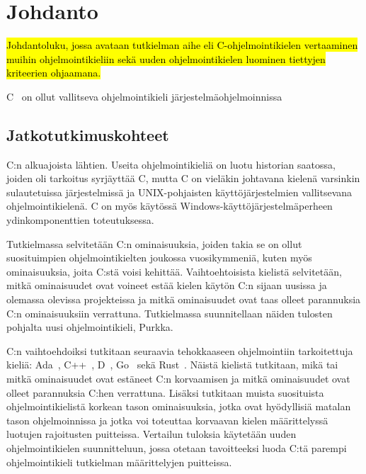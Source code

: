 \section{Johdanto}

\hl{Johdantoluku, jossa avataan tutkielman aihe eli C-ohjelmointikielen
vertaaminen muihin ohjelmointikieliin sekä uuden ohjelmointikielen luominen
tiettyjen kriteerien ohjaamana.}

C~\citep{C18} on ollut vallitseva ohjelmointikieli järjestelmäohjelmoinnissa
\subsection{Jatkotutkimuskohteet}

C:n alkuajoista lähtien. Useita ohjelmointikieliä on luotu historian saatossa,
joiden oli tarkoitus syrjäyttää C, mutta C on vieläkin johtavana kielenä
varsinkin sulautetuissa järjestelmissä ja UNIX-pohjaisten käyttöjärjestelmien
vallitsevana ohjelmointikielenä. C on myös käytössä
Windows-käyttöjärjestelmäperheen ydinkomponenttien toteutuksessa.

Tutkielmassa selvitetään C:n ominaisuuksia, joiden takia se on ollut
suosituimpien ohjelmointikielten joukossa vuosikymmeniä, kuten myös
ominaisuuksia, joita C:stä voisi kehittää. Vaihtoehtoisista kielistä
selvitetään, mitkä ominaisuudet ovat voineet estää kielen käytön C:n sijaan
uusissa ja olemassa olevissa projekteissa ja mitkä ominaisuudet ovat taas
olleet parannuksia C:n ominaisuuksiin verrattuna. Tutkielmassa suunnitellaan
näiden tulosten pohjalta uusi ohjelmointikieli, Purkka.

C:n vaihtoehdoiksi tutkitaan seuraavia tehokkaaseen ohjelmointiin tarkoitettuja
kieliä: Ada~\citep{ADA12}, C++~\citep{CPP17}, D~\citep{D}, Go~\citep{golang}
sekä Rust~\citep{rust}. Näistä kielistä tutkitaan, mikä tai mitkä ominaisuudet
ovat estäneet C:n korvaamisen ja mitkä ominaisuudet ovat olleet parannuksia
C:hen verrattuna. Lisäksi tutkitaan muista suosituista ohjelmointikielistä
korkean tason ominaisuuksia, jotka ovat hyödyllisiä matalan tason
ohjelmoinnissa ja jotka voi toteuttaa korvaavan kielen määrittelyssä luotujen
rajoitusten puitteissa. Vertailun tuloksia käytetään uuden ohjelmointikielen
suunnitteluun, jossa otetaan tavoitteeksi luoda C:tä parempi ohjelmointikieli
tutkielman määrittelyjen puitteissa.

